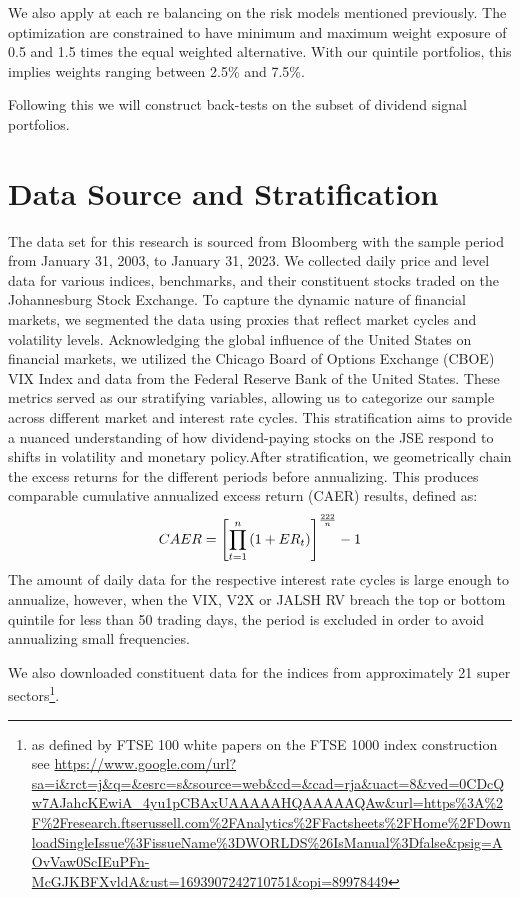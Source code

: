 \documentclass[12pt,preprint, authoryear]{elsarticle}
\numberwithin{equation}{section}
\numberwithin{figure}{section}
\numberwithin{table}{section}
\let\rmarkdownfootnote\footnote%
\def\footnote{\protect\rmarkdownfootnote}
\begin{document}
We also apply at each re balancing on the risk models mentioned
previously. The optimization are constrained to have minimum and maximum
weight exposure of 0.5 and 1.5 times the equal weighted alternative.
With our quintile portfolios, this implies weights ranging between 2.5\%
and 7.5\%.

Following this we will construct back-tests on the subset of dividend
signal portfolios.

\hypertarget{data-source-and-stratification}{%
\section{Data Source and
Stratification}\label{data-source-and-stratification}}

The data set for this research is sourced from Bloomberg with the sample
period from January 31, 2003, to January 31, 2023. We collected daily
price and level data for various indices, benchmarks, and their
constituent stocks traded on the Johannesburg Stock Exchange. To capture
the dynamic nature of financial markets, we segmented the data using
proxies that reflect market cycles and volatility levels. Acknowledging
the global influence of the United States on financial markets, we
utilized the Chicago Board of Options Exchange (CBOE) VIX Index and data
from the Federal Reserve Bank of the United States. These metrics served
as our stratifying variables, allowing us to categorize our sample
across different market and interest rate cycles. This stratification
aims to provide a nuanced understanding of how dividend-paying stocks on
the JSE respond to shifts in volatility and monetary policy.After
stratification, we geometrically chain the excess returns for the
different periods before annualizing. This produces comparable
cumulative annualized excess return (CAER) results, defined as:
\begin{align}
C A E R=\left[\prod_{t=1}^n\left(1+E R_t\right)\right]^{\frac{222}{n}}-1 \notag
\end{align} The amount of daily data for the respective interest rate
cycles is large enough to annualize, however, when the VIX, V2X or JALSH
RV breach the top or bottom quintile for less than 50 trading days, the
period is excluded in order to avoid annualizing small frequencies.

We also downloaded constituent data for the indices from approximately
21 super sectors\footnote{as defined by FTSE 100 white papers on the
  FTSE 1000 index construction see
  \url{https://www.google.com/url?sa=i\&rct=j\&q=\&esrc=s\&source=web\&cd=\&cad=rja\&uact=8\&ved=0CDcQw7AJahcKEwiA_4yu1pCBAxUAAAAAHQAAAAAQAw\&url=https\%3A\%2F\%2Fresearch.ftserussell.com\%2FAnalytics\%2FFactsheets\%2FHome\%2FDownloadSingleIssue\%3FissueName\%3DWORLDS\%26IsManual\%3Dfalse\&psig=AOvVaw0ScIEuPFn-McGJKBFXvldA\&ust=1693907242710751\&opi=89978449}}.
\end{document}
